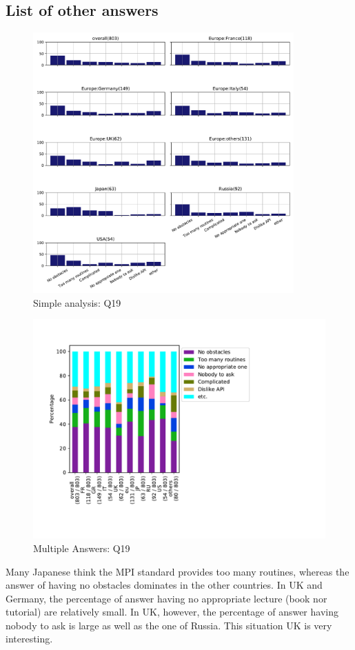 \subsection{List of other answers}
\begin{itemize}

\end{itemize}

\begin{figure}[htb]
\begin{center}
\includegraphics[width=10cm]{../pdfs/Q19.pdf}
\caption{Simple analysis: Q19}
\label{fig:Q19}
\end{center}
\end{figure}

\begin{figure}[htb]
\begin{center}
\includegraphics[width=14cm]{../pdfs/Q19-mans.pdf}
\caption{Multiple Answers: Q19}
\label{fig:Q19-mans}
\end{center}
\end{figure}

Many Japanese think the MPI standard provides too many routines, whereas the
answer of having no obstacles dominates in the other countries. In UK and
Germany, the percentage of answer having no appropriate lecture (book nor
tutorial) are relatively small. In UK, however, the percentage of answer having
nobody to ask is large as well as the one of Russia. This situation UK is very
interesting.
